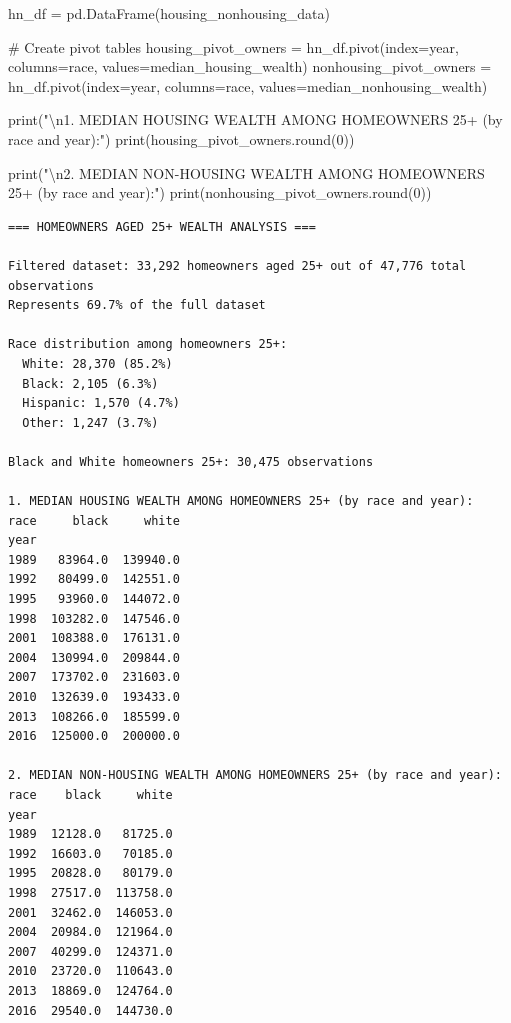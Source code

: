 \documentclass[
  letterpaper,
  DIV=11,
  numbers=noendperiod]{scrartcl}
\newenvironment{Shaded}{\begin{snugshade}}{\end{snugshade}}
\newcommand{\BuiltInTok}[1]{\textcolor[rgb]{0.00,0.23,0.31}{#1}}
\newcommand{\CharTok}[1]{\textcolor[rgb]{0.13,0.47,0.30}{#1}}
\newcommand{\CommentTok}[1]{\textcolor[rgb]{0.37,0.37,0.37}{#1}}
\newcommand{\DecValTok}[1]{\textcolor[rgb]{0.68,0.00,0.00}{#1}}
\newcommand{\NormalTok}[1]{\textcolor[rgb]{0.00,0.23,0.31}{#1}}
\newcommand{\OperatorTok}[1]{\textcolor[rgb]{0.37,0.37,0.37}{#1}}
\newcommand{\StringTok}[1]{\textcolor[rgb]{0.13,0.47,0.30}{#1}}
\begin{document}
\begin{Shaded}
\begin{Highlighting}[]
\NormalTok{hn\_df }\OperatorTok{=}\NormalTok{ pd.DataFrame(housing\_nonhousing\_data)}

\CommentTok{\# Create pivot tables}
\NormalTok{housing\_pivot\_owners }\OperatorTok{=}\NormalTok{ hn\_df.pivot(index}\OperatorTok{=}\StringTok{\textquotesingle{}year\textquotesingle{}}\NormalTok{, columns}\OperatorTok{=}\StringTok{\textquotesingle{}race\textquotesingle{}}\NormalTok{, values}\OperatorTok{=}\StringTok{\textquotesingle{}median\_housing\_wealth\textquotesingle{}}\NormalTok{)}
\NormalTok{nonhousing\_pivot\_owners }\OperatorTok{=}\NormalTok{ hn\_df.pivot(index}\OperatorTok{=}\StringTok{\textquotesingle{}year\textquotesingle{}}\NormalTok{, columns}\OperatorTok{=}\StringTok{\textquotesingle{}race\textquotesingle{}}\NormalTok{, values}\OperatorTok{=}\StringTok{\textquotesingle{}median\_nonhousing\_wealth\textquotesingle{}}\NormalTok{)}

\BuiltInTok{print}\NormalTok{(}\StringTok{"}\CharTok{\textbackslash{}n}\StringTok{1. MEDIAN HOUSING WEALTH AMONG HOMEOWNERS 25+ (by race and year):"}\NormalTok{)}
\BuiltInTok{print}\NormalTok{(housing\_pivot\_owners.}\BuiltInTok{round}\NormalTok{(}\DecValTok{0}\NormalTok{))}

\BuiltInTok{print}\NormalTok{(}\StringTok{"}\CharTok{\textbackslash{}n}\StringTok{2. MEDIAN NON{-}HOUSING WEALTH AMONG HOMEOWNERS 25+ (by race and year):"}\NormalTok{)}
\BuiltInTok{print}\NormalTok{(nonhousing\_pivot\_owners.}\BuiltInTok{round}\NormalTok{(}\DecValTok{0}\NormalTok{))}
\end{Highlighting}
\end{Shaded}

\begin{verbatim}
=== HOMEOWNERS AGED 25+ WEALTH ANALYSIS ===

Filtered dataset: 33,292 homeowners aged 25+ out of 47,776 total observations
Represents 69.7% of the full dataset

Race distribution among homeowners 25+:
  White: 28,370 (85.2%)
  Black: 2,105 (6.3%)
  Hispanic: 1,570 (4.7%)
  Other: 1,247 (3.7%)

Black and White homeowners 25+: 30,475 observations

1. MEDIAN HOUSING WEALTH AMONG HOMEOWNERS 25+ (by race and year):
race     black     white
year                    
1989   83964.0  139940.0
1992   80499.0  142551.0
1995   93960.0  144072.0
1998  103282.0  147546.0
2001  108388.0  176131.0
2004  130994.0  209844.0
2007  173702.0  231603.0
2010  132639.0  193433.0
2013  108266.0  185599.0
2016  125000.0  200000.0

2. MEDIAN NON-HOUSING WEALTH AMONG HOMEOWNERS 25+ (by race and year):
race    black     white
year                   
1989  12128.0   81725.0
1992  16603.0   70185.0
1995  20828.0   80179.0
1998  27517.0  113758.0
2001  32462.0  146053.0
2004  20984.0  121964.0
2007  40299.0  124371.0
2010  23720.0  110643.0
2013  18869.0  124764.0
2016  29540.0  144730.0
\end{verbatim}
\end{document}
